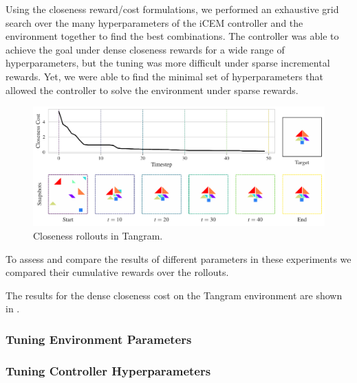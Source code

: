 Using the closeness reward/cost formulations, we performed an exhaustive grid search over the many hyperparameters of the iCEM controller and the environment together to find the best combinations.
The controller was able to achieve the goal under dense closeness rewards for a wide range of hyperparameters, but the tuning was more difficult under sparse incremental rewards.
Yet, we were able to find the minimal set of hyperparameters that allowed the controller to solve the environment under sparse rewards.

\begin{figure}[H]
    \centering
    \includegraphics[width=\textwidth]{images/closeness_trajectory_495.pdf}
    \caption{Closeness rollouts in Tangram.}
    \label{fig:closeness-rollouts}
\end{figure}

To assess and compare the results of different parameters in these experiments we compared their cumulative rewards over the rollouts.

The results for the dense closeness cost on the Tangram environment are shown in .

\subsubsection{Tuning Environment Parameters}
\label{sec:env-hyperparameters}

\label{sec:sgw-hyperparameters}


\label{sec:tangram-hyperparameters}


\subsubsection{Tuning Controller Hyperparameters}
\label{sec:icem-hyperparameters}

